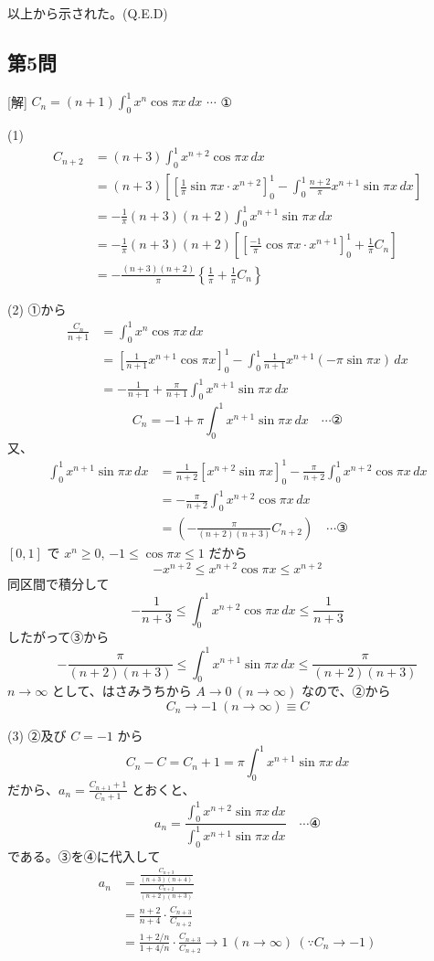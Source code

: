 \documentclass[../main.tex]{subfiles}
\begin{document}
以上から示された。(Q.E.D)

\subsection*{第5問}
[解] $C_n = (n+1) \int_0^1 x^n \cos\pi x \, dx$ $\cdots$ ①

(1)
\begin{align*}
  C_{n+2} &= (n+3) \int_0^1 x^{n+2} \cos\pi x \, dx \\
  &= (n+3) \left[ \left[ \frac{1}{\pi} \sin\pi x \cdot x^{n+2} \right]_0^1 - \int_0^1 \frac{n+2}{\pi} x^{n+1} \sin\pi x \, dx \right] \\
  &= - \frac{1}{\pi} (n+3)(n+2) \int_0^1 x^{n+1} \sin\pi x \, dx \\
  &= - \frac{1}{\pi} (n+3)(n+2) \left[ \left[ \frac{-1}{\pi} \cos\pi x \cdot x^{n+1} \right]_0^1 + \frac{1}{\pi} C_n \right] \\
  &= - \frac{(n+3)(n+2)}{\pi} \left\{ \frac{1}{\pi} + \frac{1}{\pi} C_n \right\}
\end{align*}

(2) ①から
\begin{align*}
  \frac{C_n}{n+1} &= \int_0^1 x^n \cos\pi x \, dx \\
  &= \left[ \frac{1}{n+1} x^{n+1} \cos\pi x \right]_0^1 - \int_0^1 \frac{1}{n+1} x^{n+1} (-\pi \sin\pi x) \, dx \\
  &= - \frac{1}{n+1} + \frac{\pi}{n+1} \int_0^1 x^{n+1} \sin\pi x \, dx
\end{align*}
\[ C_n = -1 + \pi \int_0^1 x^{n+1} \sin\pi x \, dx \quad \cdots \text{②} \]
又、
\begin{align*}
  \int_0^1 x^{n+1} \sin\pi x \, dx &= \frac{1}{n+2} \left[ x^{n+2} \sin\pi x \right]_0^1 - \frac{\pi}{n+2} \int_0^1 x^{n+2} \cos\pi x \, dx \\
  &= - \frac{\pi}{n+2} \int_0^1 x^{n+2} \cos\pi x \, dx \\
  &= \left( - \frac{\pi}{(n+2)(n+3)} C_{n+2} \right) \quad \cdots \text{③}
\end{align*}
$[0,1]$ で $x^n \ge 0$, $-1 \le \cos\pi x \le 1$ だから
\[ -x^{n+2} \le x^{n+2} \cos\pi x \le x^{n+2} \]
同区間で積分して
\[ - \frac{1}{n+3} \le \int_0^1 x^{n+2} \cos\pi x \, dx \le \frac{1}{n+3} \]
したがって③から
\[ - \frac{\pi}{(n+2)(n+3)} \le \int_0^1 x^{n+1} \sin\pi x \, dx \le \frac{\pi}{(n+2)(n+3)} \]
$n \to \infty$ として、はさみうちから $A \to 0 \ (n \to \infty)$ なので、②から
\[ C_n \to -1 \ (n \to \infty) \equiv C \]

(3) ②及び $C=-1$ から
\[ C_n - C = C_n + 1 = \pi \int_0^1 x^{n+1} \sin\pi x \, dx \]
だから、$a_n = \frac{C_{n+1}+1}{C_n+1}$ とおくと、
\[ a_n = \frac{\int_0^1 x^{n+2} \sin\pi x \, dx}{\int_0^1 x^{n+1} \sin\pi x \, dx} \quad \cdots \text{④} \]
である。③を④に代入して
\begin{align*}
  a_n &= \frac{\frac{C_{n+3}}{(n+3)(n+4)}}{\frac{C_{n+2}}{(n+2)(n+3)}} \\
  &= \frac{n+2}{n+4} \cdot \frac{C_{n+3}}{C_{n+2}} \\
  &= \frac{1+2/n}{1+4/n} \cdot \frac{C_{n+3}}{C_{n+2}} \to 1 \ (n \to \infty) \ (\because C_n \to -1)
\end{align*}
\end{document}
